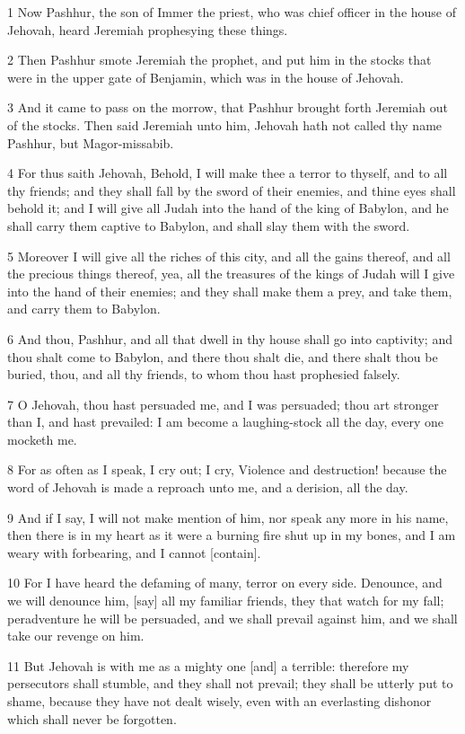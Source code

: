 \par 1 Now Pashhur, the son of Immer the priest, who was chief officer in the house of Jehovah, heard Jeremiah prophesying these things.
\par 2 Then Pashhur smote Jeremiah the prophet, and put him in the stocks that were in the upper gate of Benjamin, which was in the house of Jehovah.
\par 3 And it came to pass on the morrow, that Pashhur brought forth Jeremiah out of the stocks. Then said Jeremiah unto him, Jehovah hath not called thy name Pashhur, but Magor-missabib.
\par 4 For thus saith Jehovah, Behold, I will make thee a terror to thyself, and to all thy friends; and they shall fall by the sword of their enemies, and thine eyes shall behold it; and I will give all Judah into the hand of the king of Babylon, and he shall carry them captive to Babylon, and shall slay them with the sword.
\par 5 Moreover I will give all the riches of this city, and all the gains thereof, and all the precious things thereof, yea, all the treasures of the kings of Judah will I give into the hand of their enemies; and they shall make them a prey, and take them, and carry them to Babylon.
\par 6 And thou, Pashhur, and all that dwell in thy house shall go into captivity; and thou shalt come to Babylon, and there thou shalt die, and there shalt thou be buried, thou, and all thy friends, to whom thou hast prophesied falsely.
\par 7 O Jehovah, thou hast persuaded me, and I was persuaded; thou art stronger than I, and hast prevailed: I am become a laughing-stock all the day, every one mocketh me.
\par 8 For as often as I speak, I cry out; I cry, Violence and destruction! because the word of Jehovah is made a reproach unto me, and a derision, all the day.
\par 9 And if I say, I will not make mention of him, nor speak any more in his name, then there is in my heart as it were a burning fire shut up in my bones, and I am weary with forbearing, and I cannot [contain].
\par 10 For I have heard the defaming of many, terror on every side. Denounce, and we will denounce him, [say] all my familiar friends, they that watch for my fall; peradventure he will be persuaded, and we shall prevail against him, and we shall take our revenge on him.
\par 11 But Jehovah is with me as a mighty one [and] a terrible: therefore my persecutors shall stumble, and they shall not prevail; they shall be utterly put to shame, because they have not dealt wisely, even with an everlasting dishonor which shall never be forgotten.
